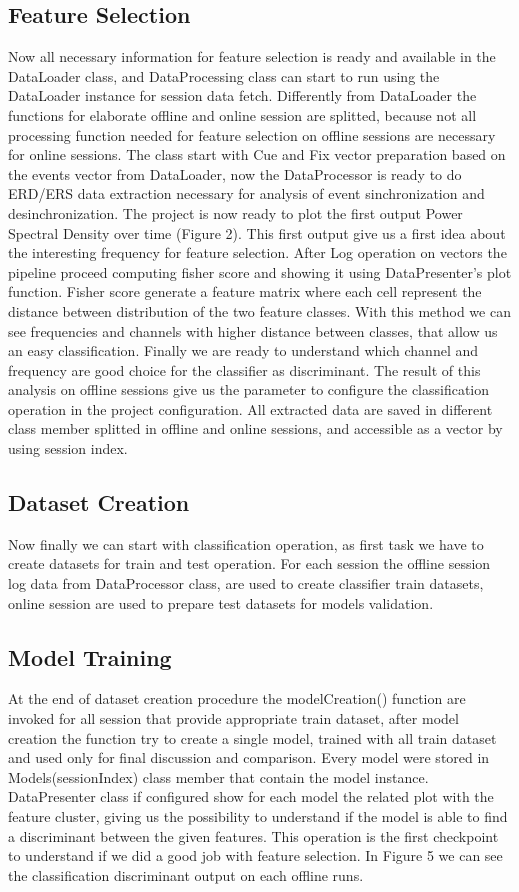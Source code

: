 \subsection{Feature Selection}\label{subsec:feature_selection}
Now all necessary information for feature selection is ready and available in the DataLoader class, and DataProcessing class can start to run using the DataLoader instance for session data fetch. Differently from DataLoader the functions for elaborate offline and online session are splitted, because not all processing function needed for feature selection on offline sessions are necessary for online sessions. The class start with Cue and Fix vector preparation based on the events vector from DataLoader, now the DataProcessor is ready to do ERD/ERS data extraction necessary for analysis of event sinchronization and desinchronization. The project is now ready to plot the first output Power Spectral Density over time (Figure 2). This first output give us a first idea about the interesting frequency for feature selection. After Log operation on vectors the pipeline proceed computing fisher score and showing it using DataPresenter's plot function. Fisher score generate a feature matrix where each cell represent the distance between distribution of the two feature classes. With this method we can see frequencies and channels with higher distance between classes, that allow us an easy classification. Finally we are ready to understand which channel and frequency are good choice for the classifier as discriminant. The result of this analysis on offline sessions give us the parameter to configure the classification operation in the project configuration. All extracted data are saved in different class member splitted in offline and online sessions, and accessible as a vector by using session index.
\subsection{Dataset Creation}\label{subsec:status}
Now finally we can start with classification operation, as first task we have to create datasets for train and test operation. For each session the offline session log data from DataProcessor class, are used to create classifier train datasets, online session are used to prepare test datasets for models validation. 
\subsection{Model Training}\label{subsec:status}
At the end of dataset creation procedure the modelCreation() function are invoked for all session that provide appropriate train dataset, after model creation the function try to create a single model, trained with all train dataset and used only for final discussion and comparison. Every model were stored in Models(sessionIndex) class member that contain the model instance. DataPresenter class if configured show for each model the related plot with the feature cluster, giving us the possibility to understand if the model is able to find a discriminant between the given features. This operation is the first checkpoint to understand if we did a good job with feature selection. In Figure 5 we can see the classification discriminant output on each offline runs.  
